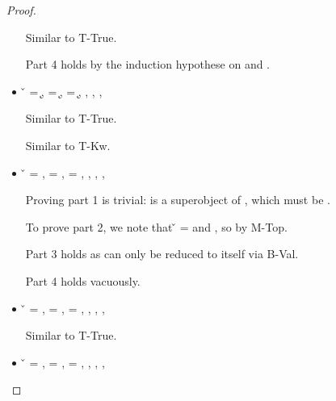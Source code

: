 \begin{lemma}
\begin{proof}
\begin{case}[B-Val]
\begin{itemize}
\begin{subcase}[T-HMap]
        Similar to T-True.

        Part 4 holds by the induction hypothese on {} and {}.
      \end{subcase}
    \item[]
      \begin{subcase}[T-Kw] \v{} = {\k{}},
  \ep{} = {\k{}},
  \e{} = {\k{}},
  \issubtypein{}{\Value{\k{}}}{\t{}},
  \inpropenv{\topprop{}}{\thenprop{\prop{}}},
  \inpropenv{\botprop{}}{\elseprop{\prop{}}},
  \issubtypein{}{\emptyobject{}}{\object{}}

        Similar to T-True.
      \end{subcase}
      \begin{subcase}[T-Str]
        Similar to T-Kw.
      \end{subcase}
  \item[] 
    \begin{subcase}[T-False]
      \v{} = \false{},
\ep{} = \false, 
\e{} = \false, 
\issubtypein{}{\False}{\t{}},
\inpropenv{\botprop{}}{\thenprop{\prop{}}},
\inpropenv{\topprop{}}{\elseprop{\prop{}}},
\issubtypein{}{\emptyobject{}}{\object{}}

Proving part 1 is trivial: \object{} is a superobject of \emptyobject{}, which must be \emptyobject{}. 

To prove part 2, we note that \v{} = \false{}
and \inpropenv{\topprop{}}{\elseprop{\prop{}}}, so \satisfies{\openv{}}{\elseprop{\prop{}}} by M-Top. 

Part 3 holds as \e{} can only be reduced to itself via B-Val.

Part 4 holds vacuously.
\end{subcase}
    \item[]
      \begin{subcase}[T-Class] \v{} = {\class{}},
  \ep{} = {\class{}},
  \e{} = {\class{}},
  \issubtypein{}{\Value{\class{}}}{\t{}},
  \inpropenv{\topprop{}}{\thenprop{\prop{}}},
  \inpropenv{\botprop{}}{\elseprop{\prop{}}},
  \issubtypein{}{\emptyobject{}}{\object{}}

        Similar to T-True.
      \end{subcase}
    \item[]
      \begin{subcase}[T-Instance]
        \v{} = {\classvalue{\classhint{}} {}},
        \ep{} = {\classvalue{\classhint{}} {\overrightarrow {\classfieldpair{\fld{}} {\v{}}}}},
        \e{} = {\classvalue{\classhint{}} {\overrightarrow {\classfieldpair{\fld{}} {\v{}}}}},
        \issubtypein{}{\class{}}{\t{}},
        \inpropenv{\topprop{}}{\thenprop{\prop{}}},
        \inpropenv{\botprop{}}{\elseprop{\prop{}}},
        \issubtypein{}{\emptyobject{}}{\object{}}



\end{subcase}
\end{itemize}
\end{case}
\end{proof}
\end{lemma}
